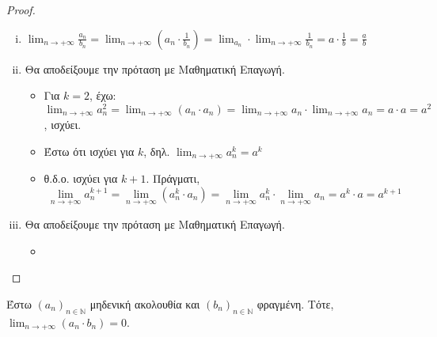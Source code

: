 \documentclass[main.tex]{subfiles}
\begin{document}
\begin{proof}
\begin{enumerate}[i)]
\begin{proof}
        Έστω $ \varepsilon >0 $, τότε
\[
    \lim_{n \to +\infty} b_{n} =b \Leftrightarrow \exists n_{2} \in \mathbb{N} \; : \; \forall n 
    \geq n_{2} \quad \abs{b - b_{n}} < \frac{\varepsilon \abs{b}^{2}}{2}
 \] 

 Επιλέγουμε $ n_{0} = \max \{ n_{1}, n_{2} \} $. Τότε $ \forall n \geq n_{0} $ ισχύει ότι 
 \[
     \abs{\frac{1}{b_{n}} - \frac{1}{b}} \leq \frac{2 \abs{b -b_{n}}}{\abs{b} ^{2}} < \varepsilon 
  \] 
    \end{proof}

\item $ \lim_{n \to +\infty} \frac{a_{n}}{b_{n}} = \lim_{n \to +\infty} 
    \left(a_{n}\cdot \frac{1}{b_{n}}
    \right) = \lim_{a_{n}} \cdot \lim_{n \to +\infty} \frac{1}{b_{n}} = a \cdot \frac{1}{b} =
    \frac{a}{b}$

\item 
Θα αποδείξουμε την πρόταση με Μαθηματική Επαγωγή.
    \begin{itemize}
        \item Για $ k=2 $, έχω: $ \lim_{n \to +\infty} a_{n}^{2} = \lim_{n \to
            +\infty} (a_{n} \cdot a_{n}) = \lim_{n \to +\infty} a_{n} \cdot \lim_{n \to +\infty}
            a_{n} =  a \cdot a = a^{2}  $, ισχύει.
        \item Έστω ότι ισχύει για $k$, δηλ. $ \lim_{n \to +\infty} a_{n}^{k} = a^{k}  $
        \item θ.δ.ο. ισχύει για $ k+1 $. Πράγματι, 
\[
    \lim_{n \to +\infty} a_{n}^{k+1}= \lim_{n \to +\infty} (a_{n}^{k} \cdot a_{n})  = \lim_{n \to
    +\infty} a_{n}^{k} \cdot \lim_{n \to +\infty} a_{n} = a^{k} \cdot a = a^{k+1}
 \] 
    \end{itemize}

\item 
Θα αποδείξουμε την πρόταση με Μαθηματική Επαγωγή.
\begin{itemize}
\item     
\end{itemize}

\end{enumerate}
\end{proof}

\begin{prop}
\item {}
    Έστω $ (a_{n})_{n \in \mathbb{N}} $ μηδενική ακολουθία και $ (b_{n})_{n \in \mathbb{N}} $ 
    φραγμένη. Τότε, $ \lim_{n \to +\infty} (a_{n}\cdot b_{n}) = 0 $. 
\end{prop}
\end{document}
